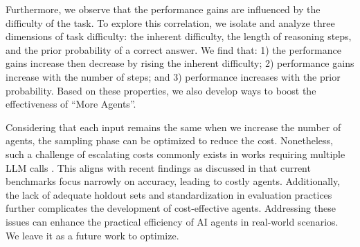 Furthermore, we observe that the performance gains are influenced by the difficulty of the task. To explore this correlation, 
we isolate and analyze three dimensions of task difficulty: the inherent difficulty, the length of reasoning steps, and the prior probability of a correct answer. 
We find that: 1) the performance gains increase then decrease by rising the inherent difficulty; 2) performance gains increase with the number of steps;  and 3) performance increases with the prior probability. Based on these properties, we also develop ways to boost the effectiveness of ``More Agents''. 

Considering that each input remains the same when we increase the number of agents, the sampling phase can be optimized to reduce the cost. Nonetheless, such a challenge of escalating costs commonly exists in works requiring multiple LLM calls \cite{cotsc, debate}. This aligns with recent findings as discussed in \cite{betterbenchmark} that current benchmarks focus narrowly on accuracy, leading to costly agents. Additionally, the lack of adequate holdout sets and standardization in evaluation practices further complicates the development of cost-effective agents. Addressing these issues can enhance the practical efficiency of AI agents in real-world scenarios. %
We leave it as a future work to optimize. %



